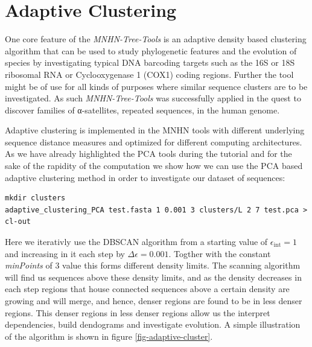 \section{Adaptive Clustering}

One core feature of the \emph{MNHN-Tree-Tools} is an adaptive density
based clustering algorithm that can be used to study phylogenetic
features and the evolution of species by investigating typical
DNA barcoding targets such as the 16S or 18S ribosomal RNA or
Cyclooxygenase 1 (COX1) coding regions. Further the tool might be of
use for all kinds of purposes where similar sequence clusters are to
be investigated. As such \emph{MNHN-Tree-Tools}
was successfully applied in the quest to discover families of
α-satellites, repeated sequences, in the human genome.

Adaptive clustering is implemented in the MNHN tools with different underlying
sequence distance measures and optimized for different computing
architectures. As we have already highlighted the PCA tools during the
tutorial and for the sake of the rapidity of the computation we show
how we can use the PCA based adaptive clustering method in order to
investigate our dataset of sequences:
\begin{lstlisting}
mkdir clusters
adaptive_clustering_PCA test.fasta 1 0.001 3 clusters/L 2 7 test.pca > cl-out
\end{lstlisting}
Here we iterativly use the DBSCAN algorithm \cite{dbscan} from a
starting value of $\epsilon_{\mathrm{int}} = 1$ and increasing in it
each step by $\Delta\epsilon = 0.001$. Togther with the constant
\emph{minPoints} of 3 value this forms different density limits. The
scanning algorithm will find us sequences above these density limits,
and as the density decreases in each step regions that house connected
sequences above a certain density are growing and will merge, and
hence, denser regions are found to be in less denser regions. This
denser regions in less denser regions allow us the interpret
dependencies, build dendograms and investigate evolution. A simple
illustration of the algorithm is shown in figure
\ref{fig-adaptive-cluster}.
